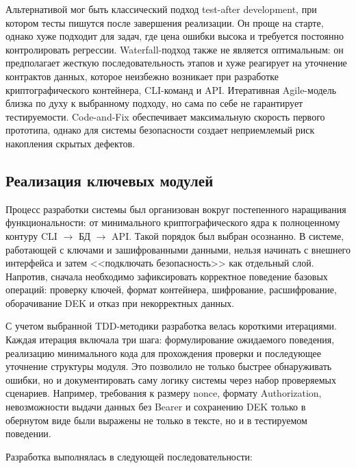 \documentclass[14pt, a4paper]{extarticle}
\begin{document}
	Альтернативой мог быть классический подход test-after development, при котором тесты пишутся после завершения реализации. Он проще на старте, однако хуже подходит для задач, где цена ошибки высока и требуется постоянно контролировать регрессии. Waterfall-подход также не является оптимальным: он предполагает жесткую последовательность этапов и хуже реагирует на уточнение контрактов данных, которое неизбежно возникает при разработке криптографического контейнера, CLI-команд и API. Итеративная Agile-модель близка по духу к выбранному подходу, но сама по себе не гарантирует тестируемости. Code-and-Fix обеспечивает максимальную скорость первого прототипа, однако для системы безопасности создает неприемлемый риск накопления скрытых дефектов.
	
	\subsection{Реализация ключевых модулей}
	
	Процесс разработки системы был организован вокруг постепенного наращивания функциональности: от минимального криптографического ядра к полноценному контуру CLI $\rightarrow$ БД $\rightarrow$ API. Такой порядок был выбран осознанно. В системе, работающей с ключами и зашифрованными данными, нельзя начинать с внешнего интерфейса и затем <<подключать безопасность>> как отдельный слой. Напротив, сначала необходимо зафиксировать корректное поведение базовых операций: проверку ключей, формат контейнера, шифрование, расшифрование, оборачивание DEK и отказ при некорректных данных.
	
	С учетом выбранной TDD-методики разработка велась короткими итерациями. Каждая итерация включала три шага: формулирование ожидаемого поведения, реализацию минимального кода для прохождения проверки и последующее уточнение структуры модуля. Это позволило не только быстрее обнаруживать ошибки, но и документировать саму логику системы через набор проверяемых сценариев. Например, требования к размеру nonce, формату Authorization, невозможности выдачи данных без Bearer и сохранению DEK только в обернутом виде были выражены не только в тексте, но и в тестируемом поведении.
	
	Разработка выполнялась в следующей последовательности:
	
\end{document}
